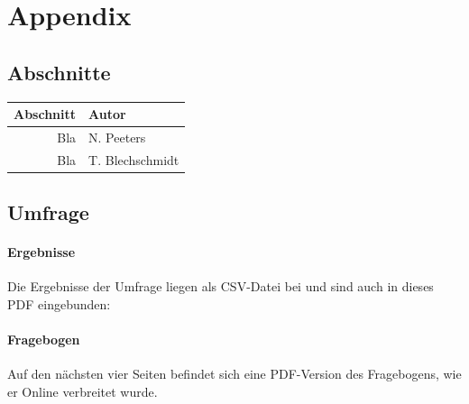\documentclass[a4paper]{article}
\begin{document}
    \clearpage
    \section{Appendix}
        \printglossary[type=\acronymtype]
        \printglossary
        
        \clearpage
        \nocite{*}
        \printbibliography
        
        \clearpage
        
        \subsection{Abschnitte}
            \begin{tabular}{rl}
              Abschnitt & Autor \\
              \hline
              Bla & N. Peeters\\
              Bla & T. Blechschmidt
            \end{tabular}
        
        \subsection{Umfrage}
            \paragraph{Ergebnisse}
                Die Ergebnisse der Umfrage liegen als CSV-Datei bei und sind auch in dieses PDF eingebunden: 
            \paragraph{Fragebogen}
                Auf den nächsten vier Seiten befindet sich eine PDF-Version des Fragebogens, wie er Online verbreitet wurde.
                
\end{document}
